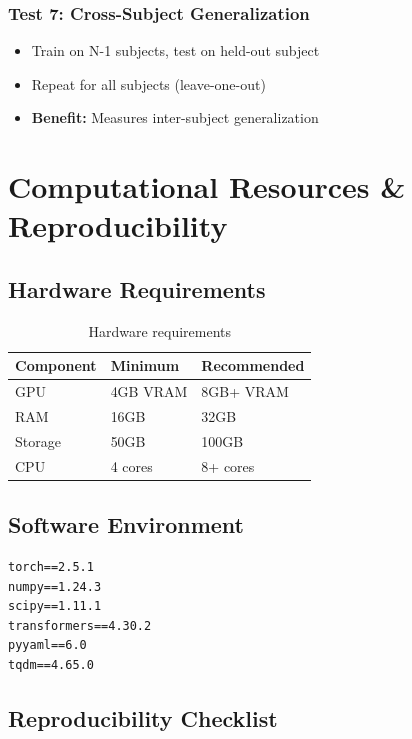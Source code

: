 \documentclass[12pt,a4paper]{article}
\begin{document}
\subsubsection{Test 7: Cross-Subject Generalization}
\begin{itemize}
    \item Train on N-1 subjects, test on held-out subject
    \item Repeat for all subjects (leave-one-out)
    \item \textbf{Benefit:} Measures inter-subject generalization
\end{itemize}

\section{Computational Resources \& Reproducibility}

\subsection{Hardware Requirements}

\begin{table}[H]
\centering
\begin{tabular}{lll}
\toprule
\textbf{Component} & \textbf{Minimum} & \textbf{Recommended} \\
\midrule
GPU & 4GB VRAM & 8GB+ VRAM \\
RAM & 16GB & 32GB \\
Storage & 50GB & 100GB \\
CPU & 4 cores & 8+ cores \\
\bottomrule
\end{tabular}
\caption{Hardware requirements}
\end{table}

\subsection{Software Environment}

\begin{lstlisting}[caption=requirements.txt]
torch==2.5.1
numpy==1.24.3
scipy==1.11.1
transformers==4.30.2
pyyaml==6.0
tqdm==4.65.0
\end{lstlisting}

\subsection{Reproducibility Checklist}
\end{document}
